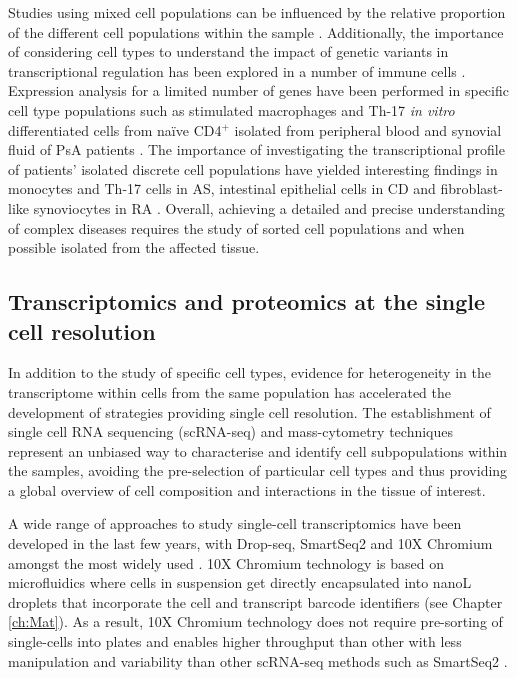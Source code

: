 Studies using mixed cell populations can be influenced by the relative proportion of the different cell populations within the sample \parencite{Whitney2003}. Additionally, the importance of considering cell types to understand the impact of genetic variants in transcriptional regulation has been explored in a number of immune cells \parencite{Fairfax2012, Fairfax2014, Raj2014, Peters2016, Kasela2017}. %
Expression analysis for a limited number of genes have been performed in specific cell type populations such as stimulated macrophages and Th-17 \textit{in vitro} differentiated cells from na\"{i}ve CD4$^+$ isolated from peripheral blood and synovial fluid of PsA patients \parencite{Antoniv2006, Leipe2010}. The importance of investigating the transcriptional profile of patients' isolated discrete cell populations have yielded interesting findings in monocytes and Th-17 cells in AS, intestinal epithelial cells in CD and fibroblast-like synoviocytes in RA \parencite{Al-Mossawi2017,Smith2008, Howell2018, Ai2016}. Overall, achieving a detailed and precise understanding of complex diseases requires the study of sorted cell populations and when possible isolated from the affected tissue.  


\subsection{Transcriptomics and proteomics at the single cell resolution}

In addition to the study of specific cell types, evidence for heterogeneity in the transcriptome within cells from the same population has accelerated the development of strategies providing single cell resolution. The establishment of single cell RNA sequencing (scRNA-seq) and mass-cytometry techniques represent an unbiased way to characterise and identify cell subpopulations within the samples, avoiding the pre-selection of particular cell types and thus providing a global overview of cell composition and interactions in the tissue of interest. 

A wide range of approaches to study single-cell transcriptomics have been developed in the last few years, with Drop-seq, SmartSeq2 and 10X Chromium amongst the most widely used \parencite{Picelli2014,Ziegenhain2017}. 10X Chromium technology is based on microfluidics where cells in suspension get directly encapsulated into nanoL droplets that incorporate the cell and transcript barcode identifiers (see Chapter \ref{ch:Mat}). As a result, 10X Chromium technology does not require pre-sorting of single-cells into plates and enables higher throughput than other with less manipulation and variability than other scRNA-seq methods such as SmartSeq2 \parencite{Baran-Gale2017}.
 
